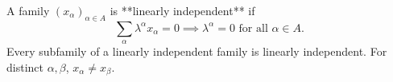A family $(x_\alpha)_{\alpha \in A}$ is **linearly independent** if
$$\sum_{\alpha} \lambda^\alpha x_\alpha = 0 \implies \lambda^\alpha = 0 \text{ for all } \alpha \in A.$$
Every subfamily of a linearly independent family is linearly independent. For distinct $\alpha, \beta$, $x_\alpha \neq x_\beta$.
